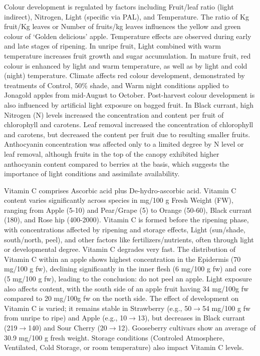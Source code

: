 \vspace{0.5em}
Colour development is regulated by factors including Fruit/leaf ratio (light indirect), Nitrogen, Light (specific via PAL), and Temperature. The ratio of Kg fruit/Kg leaves or Number of fruits/kg leaves influences the yellow and green colour of ‘Golden delicious’ apple. Temperature effects are observed during early and late stages of ripening. In unripe fruit, Light combined with warm temperature increases fruit growth and sugar accumulation. In mature fruit, red colour is enhanced by light and warm temperature, as well as by light and cold (night) temperature. Climate affects red colour development, demonstrated by treatments of Control, 50\% shade, and Warm night conditions applied to Jonagold apples from mid-August to October. Post-harvest colour development is also influenced by artificial light exposure on bagged fruit. In Black currant, high Nitrogen (N) levels increased the concentration and content per fruit of chlorophyll and carotens. Leaf removal increased the concentration of chlorophyll and carotens, but decreased the content per fruit due to resulting smaller fruits. Anthocyanin concentration was affected only to a limited degree by N level or leaf removal, although fruits in the top of the canopy exhibited higher anthocyanin content compared to berries at the basis, which suggests the importance of light conditions and assimilate availability.

\vspace{0.5em}
Vitamin C comprises Ascorbic acid plus De-hydro-ascorbic acid. Vitamin C content varies significantly across species in mg/100 g Fresh Weight (FW), ranging from Apple (5-10) and Pear/Grape (5) to Orange (50-60), Black currant (180), and Rose hip (400-2000). Vitamin C is formed before the ripening phase, with concentrations affected by ripening and storage effects, Light (sun/shade, south/north, peel), and other factors like fertilizers/nutrients, often through light or developmental degree. Vitamin C degrades very fast. The distribution of Vitamin C within an apple shows highest concentration in the Epidermis (70 mg/100 g fw), declining significantly in the inner flesh (6 mg/100 g fw) and core (5 mg/100 g fw), leading to the conclusion: do not peel an apple. Light exposure also affects content, with the south side of an apple fruit having 34 mg/100g fw compared to 20 mg/100g fw on the north side. The effect of development on Vitamin C is varied; it remains stable in Strawberry (e.g., 50$\rightarrow$54 mg/100 g fw from unripe to ripe) and Apple (e.g., 10$\rightarrow$13), but decreases in Black currant (219$\rightarrow$140) and Sour Cherry (20$\rightarrow$12). Gooseberry cultivars show an average of 30.9 mg/100 g fresh weight. Storage conditions (Controled Atmosphere, Ventilated, Cold Storage, or room temperature) also impact Vitamin C levels.


